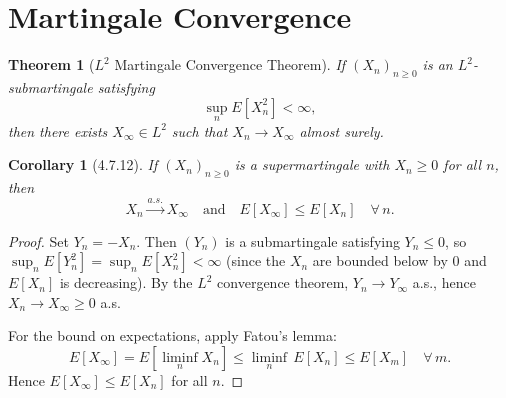 \documentclass{article}
\newtheorem{theorem}{Theorem}
\newtheorem{corollary}{Corollary}
\begin{document}
\section{Martingale Convergence}

\begin{theorem}[$L^2$ Martingale Convergence Theorem]
If $(X_n)_{n \ge 0}$ is an $L^2$-submartingale satisfying
\[
  \sup_{n} E[X_n^2] < \infty,
\]
then there exists $X_\infty \in L^2$ such that $X_n \to X_\infty$ almost surely.
\end{theorem}

\begin{corollary}[4.7.12]
If $(X_n)_{n \ge 0}$ is a supermartingale with $X_n \ge 0$ for all $n$, then
\[
  X_n \xrightarrow{a.s.} X_\infty \quad \text{and} \quad E[X_\infty] \le E[X_n] \quad \forall\, n.
\]
\end{corollary}

\begin{proof}
Set $Y_n = -X_n$. Then $(Y_n)$ is a submartingale satisfying $Y_n \le 0$, so
$\sup_n E[Y_n^2] = \sup_n E[X_n^2] < \infty$ (since the $X_n$ are bounded below
by $0$ and $E[X_n]$ is decreasing). By the $L^2$ convergence theorem,
$Y_n \to Y_\infty$ a.s., hence $X_n \to X_\infty \ge 0$ a.s.

For the bound on expectations, apply Fatou's lemma:
\[
  E[X_\infty]
  = E\!\left[\liminf_{n} X_n\right]
  \le \liminf_{n}\, E[X_n]
  \le E[X_m] \quad \forall\, m.
\]
Hence $E[X_\infty] \le E[X_n]$ for all $n$.
\end{proof}
\end{document}
